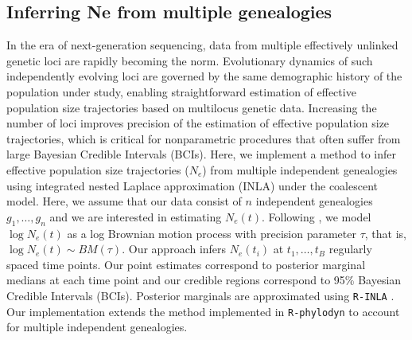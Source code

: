 \documentclass[english,titlepage]{article}
\begin{document}
\subsection*{Inferring Ne from multiple genealogies} 
In the era of next-generation sequencing, data from multiple effectively unlinked genetic loci are rapidly becoming the norm. Evolutionary dynamics of such independently evolving loci are governed by the same demographic history of the population under study, enabling straightforward estimation of effective
population size trajectories based on multilocus genetic data. Increasing the number of loci improves precision of the  estimation of effective population size trajectories, which is critical for nonparametric procedures that often suffer from large Bayesian Credible Intervals (BCIs). Here, we implement a method to infer effective population size trajectories ($N_{e}$) from multiple independent genealogies using integrated nested Laplace approximation (INLA) under the coalescent model. Here, we assume that our data consist of $n$ independent genealogies $g_{1},\ldots,g_{n}$ and we are interested in estimating $N_{e}(t)$. Following \citet{palacios2012INLA}, we model $\log N_{e}(t)$ as a log Brownian motion process with precision parameter $\tau$, that is, $\log N_{e}(t) \sim BM(\tau)$. Our approach infers $N_{e}(t_{i})$ at $t_{1},\ldots,t_{B}$ regularly spaced time points. Our point estimates correspond to posterior marginal medians at each time point and our credible regions correspond to 95\% Bayesian Credible Intervals (BCIs). Posterior marginals are approximated using \texttt{R-INLA} \citep{INLA_2009} . Our implementation extends the method implemented in \texttt{R-phylodyn} to account for multiple independent genealogies.
\end{document}
